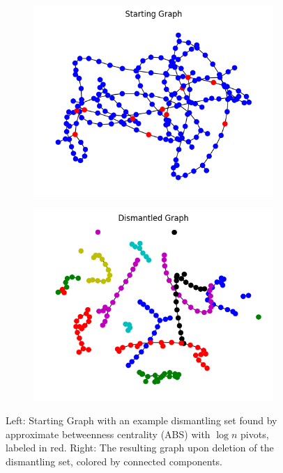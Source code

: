 \documentclass{article}
\begin{document}
\begin{figure}[h]
    \centering
    \begin{subfigure}[b]{0.4 \textwidth}
        \centering
        \includegraphics[width=\textwidth]{starting_graph_example.png}
        \label{fig:starting}
    \end{subfigure}
    \begin{subfigure}[b]{0.4 \textwidth}
        \centering
        \includegraphics[width=\textwidth]{dismantled_graph_example.png}
        \label{fig:dismantled}
    \end{subfigure}
    \caption{Left: Starting Graph with an example dismantling set found by approximate betweenness centrality (ABS) with $\log{n}$ pivots, labeled in red. Right: The resulting graph upon deletion of the dismantling set, colored by connected components.}
    \label{fig:dismantling example}
\end{figure}
\end{document}
